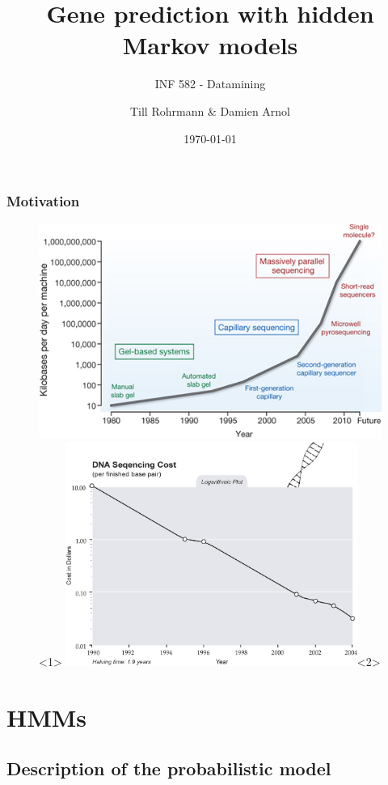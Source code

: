 \documentclass{beamer}[12pt]
\title{Gene prediction with hidden Markov models}
\subtitle{INF 582 - Datamining}
\author[T. Rohrmann \& D. Arnol]{Till Rohrmann \& Damien Arnol}
\institute{École Polytechnique}
\date{\today}
\begin{document}
\frame{
	\titlepage
}



\begin{frame}
\frametitle{Motivation}
	\begin{figure}[h]
		\centering
		\includegraphics[width=1.0\textwidth]{../picturesforthepresentation/wtdv027274.jpg}<1>
		\includegraphics[width=0.85\textwidth]{../picturesforthepresentation/DNAsequencingCost.jpg}<2>		
	\end{figure}
\end{frame}




\section{HMMs}
\subsection{Description of the probabilistic model}
\end{document}
